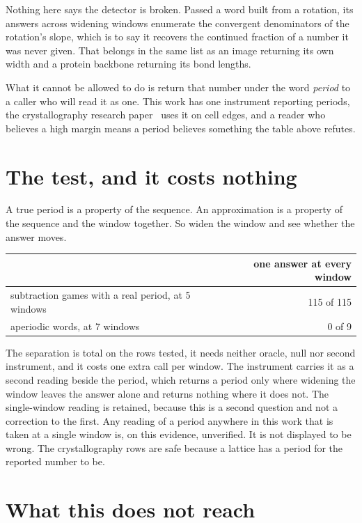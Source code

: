 Nothing here says the detector is broken. Passed a word built from a rotation, its answers across
widening windows enumerate the convergent denominators of the rotation's slope, which is to say it
recovers the continued fraction of a number it was never given. That belongs in the same list as an
image returning its own width and a protein backbone returning its bond lengths.

What it cannot be allowed to do is return that number under the word \emph{period} to a caller who
will read it as one. This work has one instrument reporting periods, the crystallography research paper~\cite{src:Quigg-crystallography}
uses it on cell edges, and a reader who believes a high margin means a period believes something the
table above refutes.

\section{The test, and it costs nothing}

A true period is a property of the sequence. An approximation is a property of the sequence and the
window together. So widen the window and see whether the answer moves.

\begin{center}
\begin{tabular}{@{}lr@{}}
\toprule
& one answer at every window \\
\midrule
subtraction games with a real period, at 5 windows & 115 of 115 \\
aperiodic words, at 7 windows & 0 of 9 \\
\bottomrule
\end{tabular}
\end{center}

The separation is total on the rows tested, it needs neither oracle, null nor second instrument,
and it costs one extra call per window. The instrument carries it as a second reading beside the period, which returns a period only where
widening the window leaves the answer alone and returns nothing where it does not. The
single-window reading is retained, because this is a second question and not a correction to the first.
Any reading of a period anywhere in this work that is taken at a single window is, on this evidence, unverified. It is not displayed to be wrong. The crystallography
rows are safe because a lattice has a period for the reported number to be.

\section{What this does not reach}

